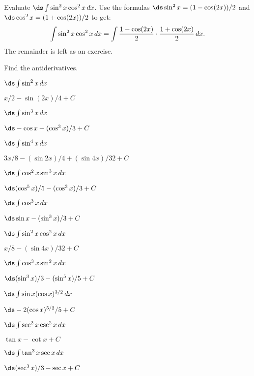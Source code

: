 \begin{example}
Evaluate $\ds\int \sin^2x\cos^2x\,dx$. 
Use the formulas
$\ds \sin^2x =(1-\cos(2x))/2$ and $\ds \cos^2x =(1+\cos(2x))/2$ to get:
$$
  \int \sin^2x\cos^2x\,dx=\int {1-\cos(2x)\over2}\cdot
  {1+\cos(2x)\over2}\,dx.
$$
The remainder is left as an exercise.
\end{example}

\begin{exercises}

Find the antiderivatives.

\twocol

\exercise $\ds\int \sin^2 x\,dx$
\begin{answer} $x/2-\sin(2x)/4+C$
\end{answer}

\exercise $\ds\int \sin^3 x\,dx$
\begin{answer} $\ds -\cos x+(\cos^3x)/3+C$
\end{answer}

\exercise $\ds\int \sin^4 x\,dx$
\begin{answer} $3x/8-(\sin 2x)/4+(\sin 4x)/32+C$
\end{answer}

\exercise $\ds\int \cos^2 x\sin^3 x\,dx$
\begin{answer} $\ds (\cos^5 x)/5-(\cos^3x)/3+C$
\end{answer}

\exercise $\ds\int \cos^3 x\,dx$
\begin{answer} $\ds \sin x-(\sin^3x)/3+C$
\end{answer}

\exercise $\ds\int \sin^2 x\cos^2 x\,dx$
\begin{answer} $x/8-(\sin 4x)/32+C$
\end{answer}

\exercise $\ds\int \cos^3 x \sin^2 x\,dx$
\begin{answer} $\ds (\sin^3x)/3-(\sin^5x)/5+C$
\end{answer}

\exercise $\ds\int \sin x (\cos x)^{3/2}\,dx$
\begin{answer} $\ds -2(\cos x)^{5/2}/5+C$
\end{answer}

\exercise $\ds\int \sec^2 x\csc^2 x\,dx$
\begin{answer} $\tan x-\cot x+C$
\end{answer}

\exercise $\ds\int \tan^3x \sec x\,dx$
\begin{answer} $\ds (\sec^3x)/3-\sec x+C$
\end{answer}

\endtwocol

\end{exercises}

